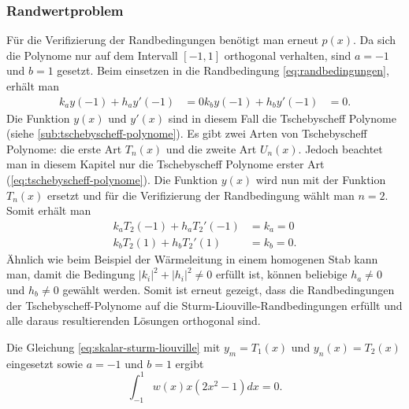 \subsubsection*{Randwertproblem}
Für die Verifizierung der Randbedingungen benötigt man erneut $p(x)$.
Da sich die Polynome nur auf dem Intervall $[ -1,1 ]$ orthogonal verhalten, sind $a = -1$ und $b = 1$ gesetzt.
Beim einsetzen in die Randbedingung \ref{eq:randbedingungen}, erhält man
\begin{equation}
\begin{aligned}
	k_a y(-1) + h_a y'(-1) &= 0
	k_b y(-1) + h_b y'(-1) &= 0.
\end{aligned} 
\end{equation}
Die Funktion $y(x)$ und $y'(x)$ sind in diesem Fall die Tschebyscheff Polynome (siehe \ref{sub:tschebyscheff-polynome}).
Es gibt zwei Arten von Tschebyscheff Polynome: die erste Art $T_n(x)$ und die zweite Art $U_n(x)$.
Jedoch beachtet man in diesem Kapitel nur die Tschebyscheff Polynome erster Art (\ref{eq:tschebyscheff-polynome}).
Die Funktion $y(x)$ wird nun mit der Funktion $T_n(x)$ ersetzt und für die Verifizierung der Randbedingung wählt man $n=2$.
Somit erhält man
\begin{equation}
	\begin{aligned}
	k_a T_2(-1) + h_a T_{2}'(-1) &= k_a = 0\\
	k_b T_2(1) + h_b T_{2}'(1) &= k_b = 0.
\end{aligned}
\end{equation}
Ähnlich wie beim Beispiel der Wärmeleitung in einem homogenen Stab kann man, damit die Bedingung $|k_i|^2 + |h_i|^2\ne 0$ erfüllt ist, können beliebige $h_a \ne 0$ und $h_b \ne 0$ gewählt werden.
Somit ist erneut gezeigt, dass die Randbedingungen der Tschebyscheff-Polynome auf die Sturm-Liouville-Randbedingungen erfüllt und alle daraus resultierenden Lösungen orthogonal sind.

\begin{beispiel}
	Die Gleichung \ref{eq:skalar-sturm-liouville} mit $y_m = T_1(x)$ und $y_n(x) = T_2(x)$ eingesetzt sowie $a=-1$ und $b = 1$ ergibt
	\[
	\int_{-1}^{1} w(x) x (2x^2-1) dx = 0.
	\]
\end{beispiel}

 










